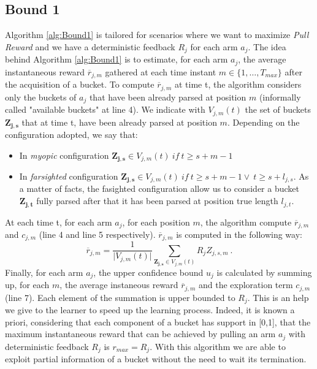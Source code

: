\subsection{Bound 1}
Algorithm \ref{alg:Bound1} is tailored for scenarios where we want to maximize \emph{Pull Reward} and we have a deterministic feedback $R_j$ for each arm $a_j$. The idea behind Algorithm \ref{alg:Bound1} is to estimate, for each arm $a_j$, the average instantaneous reward $\overline{r}_{j,m}$ gathered at each time instant $m \in \{1, \ldots,T_{max}\}$ after the acquisition of a bucket. To compute $\overline{r}_{j,m}$ at time t, the algorithm considers only the buckets of $a_j$ that have been already parsed at position $m$ (informally called "available buckets" at line 4). We indicate with $V_{j,m}(t)$ the set of buckets $\boldsymbol{Z_{j,s}}$ that at time t, have been already parsed at position $m$. Depending on the configuration adopted, we say that:
\begin{itemize}
	\item In \emph{myopic} configuration  $\boldsymbol{Z_{j,s}} \in V_{j,m}(t) \ if \ t\geq s+m-1$
	\item In \emph{farsighted} configuration  $\boldsymbol{Z_{j,s}} \in V_{j,m}(t) \ if \ t\geq s+m-1 \vee \ t \geq s+l_{j,s} $. As a matter of facts, the fasighted configuration allow us to consider a bucket $\boldsymbol{Z_{j,t}}$ fully parsed after that it has been parsed at position true length $l_{j,t}$. 
\end{itemize}


At each time t, for each arm $a_j$, for each position $m$, the algorithm compute $\overline{r}_{j,m}$ and $c_{j,m}$ (line 4 and line 5 respectively). $\overline{r}_{j,m}$ is computed in the following way: $$\overline{r}_{j,m} = \frac{1}{\vert V_{j,m}(t) \vert} \sum_{\boldsymbol{Z_{j,s}} \in V_{j,m}(t)} R_jZ_{j,s,m}\ .$$
Finally, for each arm $a_j$, the upper confidence bound $u_j$ is calculated by summing up, for each $m$, the average instaneous reward $\overline{r}_{j,m}$ and the exploration term  $c_{j,m}$  (line 7). Each element of the summation is upper bounded to $R_j$. This is an help we give to the learner to speed up the learning process. Indeed, it is known a priori, considering that each component of a bucket has support in [0,1], that the maximum instantaneous reward that can be achieved by pulling an arm $a_j$ with deterministic feedback $R_j$ is $r_{max} = R_j$. With this algorithm we are able to exploit partial information of a bucket without the need to wait its termination.









